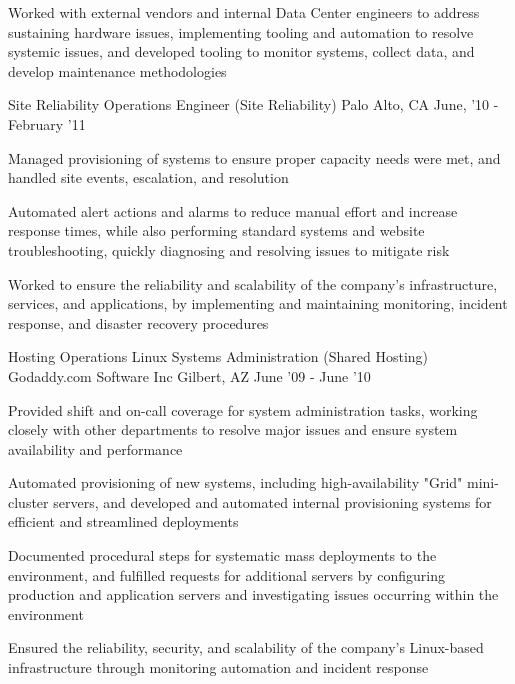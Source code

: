 \begin{cventries}
{\begin{cvitems}
		  \item Worked with external vendors and internal Data Center engineers to address sustaining hardware issues, implementing tooling and automation to resolve systemic issues, and developed tooling to monitor systems, collect data, and develop maintenance methodologies
        \end{cvitems}
    }
\vspace{0mm}
\cventry
	{Site Reliability Operations Engineer \color{solarized-orange}(Site Reliability)} %
    {} %
    {Palo Alto, CA} %
    {June, '10 - February '11} %
    {
        \begin{cvitems}
		  \item Managed provisioning of systems to ensure proper capacity needs were met, and handled site events, escalation, and resolution
	      \item Automated alert actions and alarms to reduce manual effort and increase response times, while also performing standard systems and website troubleshooting, quickly diagnosing and resolving issues to mitigate risk
		  \item Worked to ensure the reliability and scalability of the company's infrastructure, services, and applications, by implementing and maintaining monitoring, incident response, and disaster recovery procedures
        \end{cvitems}
    }
\vspace{2mm}
\cventry
	{Hosting Operations Linux Systems Administration \color{solarized-orange}(Shared Hosting)} %
    {Godaddy.com Software Inc} %
    {Gilbert, AZ} %
    {June '09 - June '10} %
    {
        \begin{cvitems}
		  \item Provided shift and on-call coverage for system administration tasks, working closely with other departments to resolve major issues and ensure system availability and performance
		  \item Automated provisioning of new systems, including high-availability "Grid" mini-cluster servers, and developed and automated internal provisioning systems for efficient and streamlined deployments
		  \item Documented procedural steps for systematic mass deployments to the environment, and fulfilled requests for additional servers by configuring production and application servers and investigating issues occurring within the environment
		  \item Ensured the reliability, security, and scalability of the company's Linux-based infrastructure through monitoring automation and incident response

\end{cvitems}}
\end{cventries}
